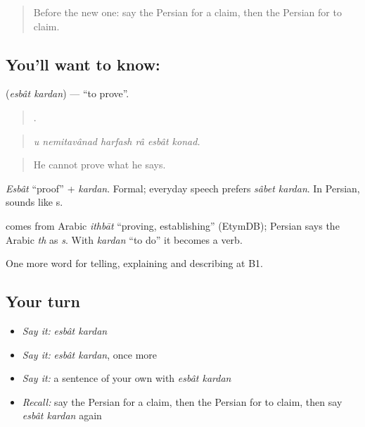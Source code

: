 \label{lesson:FA-C363-esbat-kardan}



\begin{quote}
Before the new one: say the Persian for a claim, then the Persian for to claim.
\end{quote}

\subsection*{You'll want to know:  }
\textbf{ } (\emph{esbât kardan}) — \textquotedblleft{}to prove\textquotedblright{}.

\begin{quote}
     .
\end{quote}

\begin{quote}
\emph{u nemitavânad harfash râ esbât konad.}
\end{quote}

\begin{quote}
He cannot prove what he says.
\end{quote}

\emph{Esbât} \textquotedblleft{}proof\textquotedblright{} + \emph{kardan}. Formal; everyday speech prefers \emph{sâbet kardan}. In Persian,  sounds like s.

\begin{cousinweb}
\textbf{} comes from Arabic \emph{ithbāt} \textquotedblleft{}proving, establishing\textquotedblright{} (EtymDB); Persian says the Arabic \emph{th} as \emph{s}. With \emph{kardan} \textquotedblleft{}to do\textquotedblright{} it becomes a verb.
\end{cousinweb}

\begin{grammarlens}[title={What you've built}]
One more word for telling, explaining and describing at B1.
\end{grammarlens}

\subsection*{Your turn}
\begin{itemize}
\raggedright
  \item \emph{Say it:} \emph{esbât kardan}
  \item \emph{Say it:} \emph{esbât kardan}, once more
  \item \emph{Say it:} a sentence of your own with \emph{esbât kardan}
  \item \emph{Recall:} say the Persian for a claim, then the Persian for to claim, then say \emph{esbât kardan} again
\end{itemize}

